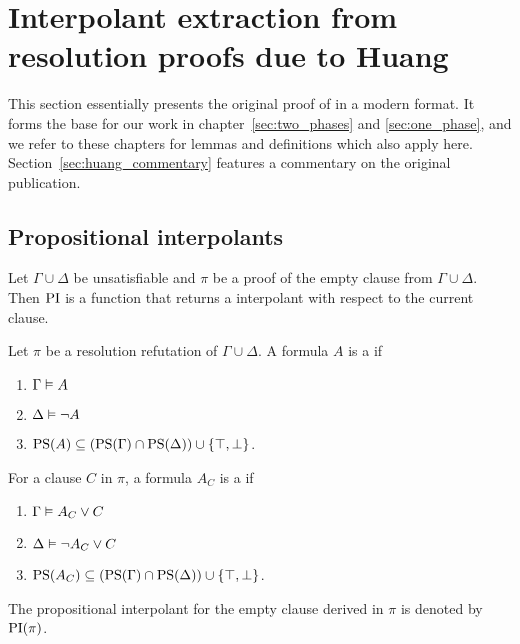 
\chapter{Interpolant extraction from resolution proofs due to Huang}  
\label{sec:huang}
\label{chap:huang}

This section essentially presents the original proof of \cite{Huang95} in a modern format.
It forms the base for our work in chapter~\ref{sec:two_phases} and \ref{sec:one_phase}, and we refer to these chapters for lemmas and definitions which also apply here.
Section~\ref{sec:huang_commentary} features a commentary on the original publication. 

\section{Propositional interpolants}


Let $\Gamma \cup \Delta$ be unsatisfiable and $\pi$ be a proof of the empty clause from $\Gamma \cup \Delta$. Then $\operatorname{PI}$ is a function that returns a interpolant with respect to the current clause. 

\begin{defi}
	Let $\pi$ be a resolution refutation of $\Gamma \cup \Delta$.
	A formula $A$ is a  if
	\label{def:huang_orig_rel_prop_interpol}
	\begin{enumerate}
		\item $\Gamma \vDash A$
			\label{huang_orig_rel_prop_interpol_cond1}
		\item $\Delta \vDash \lnot A$
			\label{huang_orig_rel_prop_interpol_cond2}
		\item $\operatorname{PS}(A) \subseteq (\operatorname{PS}(\Gamma) \cap \operatorname{PS}(\Delta)) \cup \{\top, \bot\} $.
			\label{huang_orig_rel_prop_interpol_cond_lang}
	\end{enumerate}


	For a clause $C$ in $\pi$, a formula $A_C$ is a  if
	\begin{enumerate}
		\item $\Gamma \vDash A_C \lor C$
		\item $\Delta \vDash \lnot A_C \lor C$
		\item $\operatorname{PS}(A_C) \subseteq (\operatorname{PS}(\Gamma) \cap \operatorname{PS}(\Delta)) \cup \{\top, \bot\} $.
	\end{enumerate}

	The propositional interpolant for the empty clause derived in $\pi$ is denoted by $\operatorname{PI}(\pi)$.\qedhere
\end{defi}

